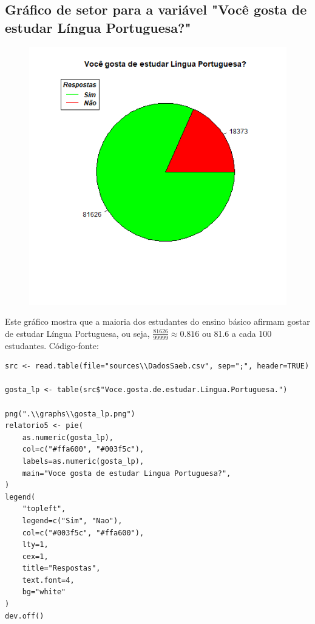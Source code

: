 \documentclass[17pt]{extarticle}
\begin{document}
\subsection{Gráfico de setor para a variável "Você gosta de estudar Língua Portuguesa?"}
\begin{figure}[H]
    \includegraphics[width=0.7\linewidth]{gosta_lp.png}
    \centering
\end{figure}
Este gráfico mostra que a maioria dos estudantes do ensino básico afirmam gostar de estudar Língua Portuguesa, ou seja, \(\frac{81626}{99999} \approx 0.816\) ou 81.6 a cada 100 estudantes. \newline
Código-fonte:
\begin{lstlisting}
src <- read.table(file="sources\\DadosSaeb.csv", sep=";", header=TRUE)

gosta_lp <- table(src$"Voce.gosta.de.estudar.Lingua.Portuguesa.")

png(".\\graphs\\gosta_lp.png")
relatorio5 <- pie(
    as.numeric(gosta_lp),
    col=c("#ffa600", "#003f5c"),
    labels=as.numeric(gosta_lp),
    main="Voce gosta de estudar Lingua Portuguesa?",
)
legend(
    "topleft",
    legend=c("Sim", "Nao"),
    col=c("#003f5c", "#ffa600"),
    lty=1,
    cex=1,
    title="Respostas",
    text.font=4,
    bg="white"
)
dev.off()
\end{lstlisting}
\end{document}
